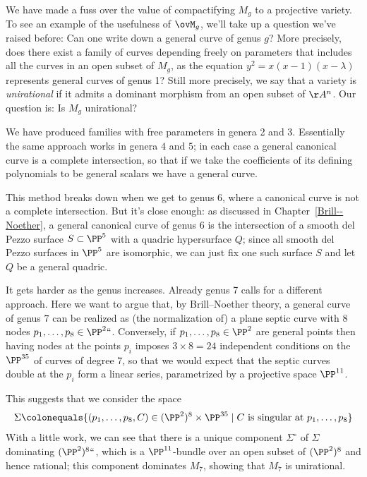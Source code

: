We have made a fuss over the value of compactifying $M_g$ to a projective variety. To see an example of the usefulness of $\ovM_g$, we'll take up a question we've raised before: Can one write down a general curve of genus $g$?
More precisely,  does there exist a family of curves depending freely
on parameters that includes all the curves in an open subset of
$M_{g}$,
as the equation $y^{2} = x(x-1)(x-\lambda)$ 
represents general curves of genus 1? Still more precisely,
we say that a variety is \emph{unirational} 
if it admits a 
dominant morphism
%
from an open subset of $\AA^{n}$. 
Our question is: Is $M_g$ unirational?

We have produced  families with free parameters in genera 2 and 3. Essentially
the same approach works in genera $4$ and $5$; in each case a general
canonical curve is a 
complete intersection, 
%
so that if we take the coefficients of its defining polynomials to be
general scalars we have a general curve.

This method breaks down when we get to genus 6, where a canonical curve is not a complete intersection. But it's close enough: as discussed in Chapter~\ref{Brill--Noether}, a general canonical curve of genus 6 is the intersection of a smooth del Pezzo surface $S \subset \PP^5$ with a quadric hypersurface $Q$; since all smooth del Pezzo surfaces in $\PP^5$ are isomorphic, we can just fix one such surface $S$ and let $Q$ be a general quadric.

It gets harder as the genus increases. Already genus 7 calls for a
different approach. Here we want to argue that, by 
Brill--Noether theory,
%
a general curve of genus $7$ can be realized as (the normalization of)
a plane 
septic curve 
%
with 8 nodes $p_1,\dots,p_8 \in \PP^2` `$. Conversely, if $p_1,\dots,p_8 \in \PP^2$ are general points then having nodes at the points $p_i$ imposes $ 3\times 8 = 24$ independent conditions on the $\PP^{35}$ of curves of degree 7, so that we would expect that the septic curves double at the $p_i$ form a linear series, parametrized by a projective space $\PP^{11}$.

This suggests that we consider the space
$$
\Sigma \colonequals  \{ (p_1,\dots,p_8,C) \in (\PP^2)^8 \times \PP^{35} \mid C \text{ is singular at } p_1,\dots,p_8 \}
$$
With a little work, we can see that there is a unique component $\Sigma^\circ$ of $\Sigma$ dominating $(\PP^2)^8` `$, which is a $\PP^{11}$-bundle over an open subset of $(\PP^2)^8$ and hence rational; this component dominates $M_7$, showing that $M_7$ is unirational.

